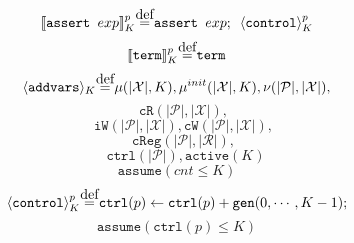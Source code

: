 \documentclass{article}
\newcommand{\var}{\texttt}
\newcommand\myeq{\stackrel{\mathclap{\normalfont\mbox{def}}}{=}}
\begin{document}
\vspace{-1.2em}
$$\llbracket \texttt{assert } exp \rrbracket_K^p \myeq \texttt{assert } exp ; \kern 0.5em \langle \texttt{control} \rangle_K^p$$
\vspace{-1.2em}
$$\llbracket\texttt{term}\rrbracket_K^p \myeq \texttt{term}$$
\vspace{-1.2em}
$$\langle \var{addvars} \rangle_K \myeq \mu(|\mathcal{X}|,K), \mu^{init}(|\mathcal{X}|,K), \nu(|\mathcal{P}|,|\mathcal{X}|),$$
$$ \quad\var{cR}(|\mathcal{P}|,|\mathcal{X}|),$$
$$ \quad\var{iW}(|\mathcal{P}|,|\mathcal{X}|), \var{cW}(|\mathcal{P}|,|\mathcal{X}|),$$
$$ \quad\var{cReg}(|\mathcal{P}|,|\mathcal{R}|),$$
$$ \quad\;\var{ctrl}(|\mathcal{P}|), \var{active}(K)$$
\vspace{-1.2em}
$$ \texttt{assume}(cnt \leq K)$$
\vspace{-1.2em}
$$ \langle \texttt{control} \rangle_K^p \myeq \texttt{ctrl}(p) \leftarrow \texttt{ctrl}(p) + \texttt{gen}(0,\cdots,K-1);$$
\vspace{-1.7em}
$$ \texttt{assume}(\texttt{ctrl}(p) \leq K)$$
\end{document}
